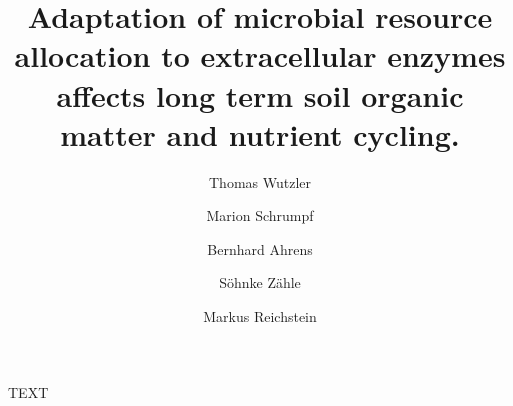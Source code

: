 \documentclass[SOIL]{copernicus}
\begin{document}
 

\linenumbers

\title{Adaptation of microbial resource allocation to extracellular
enzymes affects long term soil organic matter and nutrient cycling.}

\author[1]{Thomas Wutzler}
\author[1]{Marion Schrumpf}
\author[1]{Bernhard Ahrens}
\author[1]{S\"ohnke Z\"ahle}
\author[1]{Markus Reichstein}










\received{}
\pubdiscuss{} %
\revised{}
\accepted{}
\published{} 




\maketitle  %





\begin{abstract}

\end{abstract}






\appendix





\begin{acknowledgements}
TEXT
\end{acknowledgements} 






%
%
 


\end{document}
